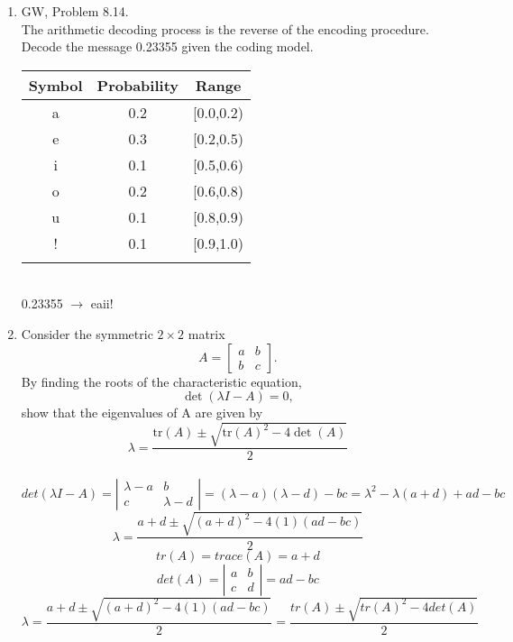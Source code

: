 \documentclass{article}
\begin{document}
\begin{enumerate}
  \item GW, Problem 8.14.\\
        The arithmetic decoding process is the reverse of the encoding
        procedure. Decode the message 0.23355 given the coding model.\\
  \linebreak
  \begin{tabular}{ccc}
    \hline
    Symbol & Probability & Range\\
    \hline
    a & 0.2 & [0.0,0.2)\\
    e & 0.3 & [0.2,0.5)\\
    i & 0.1 & [0.5,0.6)\\
    o & 0.2 & [0.6,0.8)\\
    u & 0.1 & [0.8,0.9)\\
    ! & 0.1 & [0.9,1.0)\\
    \hline\\
  \end{tabular}\\
  0.23355 $\rightarrow$ eaii!\\

  \item Consider the symmetric $2\times 2$ matrix
        $$A=\left[\begin{array}{cc}a&b\\b&c\end{array}\right].$$
        By finding the roots of the characteristic equation, 
        $$\det(\lambda I-A)=0,$$ show that the eigenvalues of A are given by
        $$\lambda = \frac{\mbox{tr}(A)\pm\sqrt{\mbox{tr}(A)^2-4\det(A)}}{2}$$\\
        \linebreak
        $$det(\lambda I-A) = \left|\begin{array}{cc}
                                     \lambda-a & b\\
                                     c & \lambda-d
                                   \end{array}\right|
          = (\lambda-a)(\lambda-d)-bc = \lambda^2-\lambda(a+d)+ad-bc$$
        $$\lambda = \frac{a+d\pm\sqrt{(a+d)^2-4(1)(ad-bc)}}{2}$$
        $$tr(A) = trace(A) = a + d$$
        $$det(A) = \left|\begin{array}{cc}
                           a & b\\
                           c & d
                         \end{array}\right| = ad-bc$$
        $$\lambda = \frac{a+d\pm\sqrt{(a+d)^2-4(1)(ad-bc)}}{2}
          = \frac{tr(A)\pm\sqrt{tr(A)^2-4det(A)}}{2}$$\\
\end{enumerate}
\end{document}

